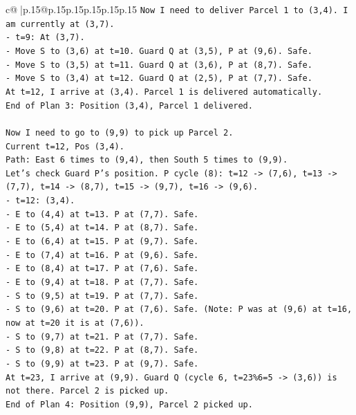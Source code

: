\documentclass{article}
\begin{document}
{\begin{supertabular}{c@{$\;$}|p{.15\linewidth}@{}p{.15\linewidth}p{.15\linewidth}p{.15\linewidth}p{.15\linewidth}p{.15\linewidth}}
{{{\texttt{Now I need to deliver Parcel 1 to (3,4). I am currently at (3,7).} \\
\texttt{{-} t=9: At (3,7).} \\
\texttt{{-} Move S to (3,6) at t=10. Guard Q at (3,5), P at (9,6). Safe.} \\
\texttt{{-} Move S to (3,5) at t=11. Guard Q at (3,6), P at (8,7). Safe.} \\
\texttt{{-} Move S to (3,4) at t=12. Guard Q at (2,5), P at (7,7). Safe.} \\
\texttt{At t=12, I arrive at (3,4). Parcel 1 is delivered automatically.} \\
\texttt{End of Plan 3: Position (3,4), Parcel 1 delivered.} \\
\\ 
\texttt{Now I need to go to (9,9) to pick up Parcel 2.} \\
\texttt{Current t=12, Pos (3,4).} \\
\texttt{Path: East 6 times to (9,4), then South 5 times to (9,9).} \\
\texttt{Let's check Guard P's position. P cycle (8): t=12 {-}> (7,6), t=13 {-}> (7,7), t=14 {-}> (8,7), t=15 {-}> (9,7), t=16 {-}> (9,6).} \\
\texttt{{-} t=12: (3,4).} \\
\texttt{{-} E to (4,4) at t=13. P at (7,7). Safe.} \\
\texttt{{-} E to (5,4) at t=14. P at (8,7). Safe.} \\
\texttt{{-} E to (6,4) at t=15. P at (9,7). Safe.} \\
\texttt{{-} E to (7,4) at t=16. P at (9,6). Safe.} \\
\texttt{{-} E to (8,4) at t=17. P at (7,6). Safe.} \\
\texttt{{-} E to (9,4) at t=18. P at (7,7). Safe.} \\
\texttt{{-} S to (9,5) at t=19. P at (7,7). Safe.} \\
\texttt{{-} S to (9,6) at t=20. P at (7,6). Safe. (Note: P was at (9,6) at t=16, now at t=20 it is at (7,6)).} \\
\texttt{{-} S to (9,7) at t=21. P at (7,7). Safe.} \\
\texttt{{-} S to (9,8) at t=22. P at (8,7). Safe.} \\
\texttt{{-} S to (9,9) at t=23. P at (9,7). Safe.} \\
\texttt{At t=23, I arrive at (9,9). Guard Q (cycle 6, t=23\%6=5 {-}> (3,6)) is not there. Parcel 2 is picked up.} \\
\texttt{End of Plan 4: Position (9,9), Parcel 2 picked up.} \\
}}}
\end{supertabular}}
\end{document}
